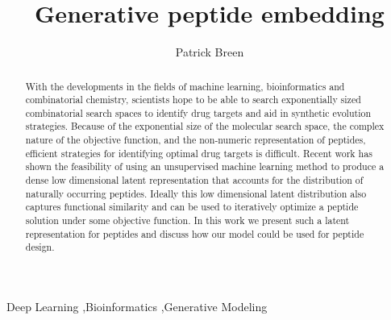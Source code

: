 \documentclass[final,1p,times]{elsarticle}
\begin{document}
\begin{frontmatter}


\title{Generative peptide embedding}




\author{Patrick Breen}
\address{Institute of Bioinformatics, University of Georgia}

\begin{abstract}
With the developments in the fields of machine learning, bioinformatics and combinatorial chemistry, scientists hope to be able to search exponentially sized combinatorial search spaces to identify drug targets and aid in synthetic evolution strategies. Because of the exponential size of the molecular search space, the complex nature of the objective function, and the non-numeric representation of peptides, efficient strategies for identifying optimal drug targets is difficult. Recent work has shown the feasibility of using an unsupervised machine learning method to produce a dense low dimensional latent representation that accounts for the distribution of naturally occurring peptides. Ideally this low dimensional latent distribution also captures functional similarity and can be used to iteratively optimize a peptide solution under some objective function. In this work we present such a latent representation for peptides and discuss how our model could be used for peptide design.
\end{abstract}

\begin{keyword}
Deep Learning \sep Bioinformatics \sep Generative Modeling


\end{keyword}

\end{frontmatter}
\end{document}
